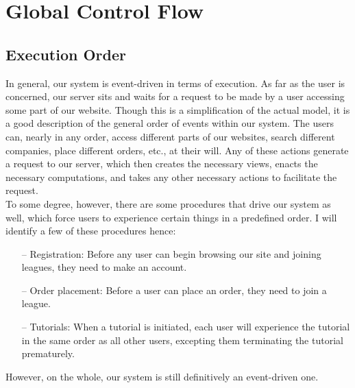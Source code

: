 \section{Global Control Flow}
\subsection{Execution Order}
In general, our system is event-driven in terms of execution. As far as the user is concerned, our server sits and waits for a request to be made by a user accessing some part of our website. Though this is a simplification of the actual model, it is a good description of the general order of events within our system. The users can, nearly in any order, access different parts of our websites, search different companies, place different orders, etc., at their will. Any of these actions generate a request to our server, which then creates the necessary views, enacts the necessary computations, and takes any other necessary actions to facilitate the request. \\

To some degree, however, there are some procedures that drive our system as well, which force users to experience certain things in a predefined order. I will identify a few of these procedures hence:
\begin{itemize}
\item[--]{Registration: Before any user can begin browsing our site and joining leagues, they need to make an account.}
\item[--]{Order placement: Before a user can place an order, they need to join a league.}
\item[--]{Tutorials: When a tutorial is initiated, each user will experience the tutorial in the same order as all other users, excepting them terminating the tutorial prematurely.}
\end{itemize}
However, on the whole, our system is still definitively an event-driven one.

